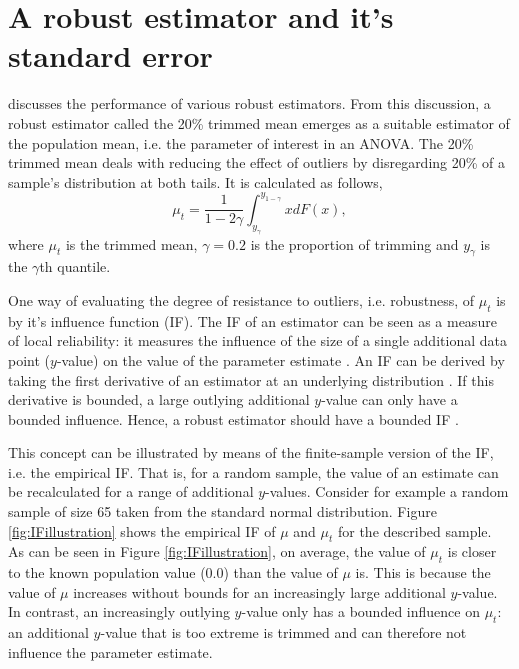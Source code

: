 \documentclass[11pt, a4paper]{article}
\begin{document}

\section{A robust estimator and it's standard error}
\label{section: Robust estimators}

\citet[pp.~45-93]{Wilcox2017} discusses the performance of various robust estimators. From this discussion, a robust estimator called the 20\% trimmed mean emerges as a suitable estimator of the population mean, i.e. the parameter of interest in an ANOVA. 
The 20\% trimmed mean deals with reducing the effect of outliers by disregarding 20\% of a sample's distribution at both tails. 
It is calculated as follows,
\begin{equation}
\mu_t = \frac{1}{1-2\gamma} \int_{y_\gamma}^{y_{1-\gamma}} xdF(x),
\end{equation}
where $\mu_t$ is the trimmed mean, $\gamma = 0.2$ is the proportion of trimming and $y_\gamma$ is the $\gamma$th quantile.

One way of evaluating the degree of resistance to outliers, i.e. robustness, of $\mu_t$ is by it's influence function (IF). 
The IF of an estimator can be seen as a measure of local reliability: it measures the influence of the size of a single additional data point ($y$-value) on the value of the parameter estimate \citep{Ruckstuhl2014}. 
An IF can be derived by taking the first derivative of an estimator at an underlying distribution \citep*[pp.~29-30]{Wilcox2017}. 
If this derivative is bounded, a large outlying additional $y$-value can only have a bounded influence. 
Hence, a robust estimator should have a bounded IF \citep[p.~30]{Wilcox2017}.

This concept can be illustrated by means of the finite-sample version of the IF, i.e. the empirical IF.
That is, for a random sample, the value of an estimate can be recalculated for a range of additional $y$-values.
Consider for example a random sample of size 65 taken from the standard normal distribution. 
Figure \ref{fig:IFillustration} shows the empirical IF of $\mu$ and $\mu_t$ for the described sample. 
As can be seen in Figure \ref{fig:IFillustration}, on average, the value of $\mu_t$ is closer to the known population value ($0.0$) than the value of $\mu$ is. This is because the value of $\mu$ increases without bounds for an increasingly large additional $y$-value. 
In contrast, an increasingly outlying $y$-value only has a bounded influence on $\mu_t$: an additional $y$-value that is too extreme is trimmed and can therefore not influence the parameter estimate. 
\end{document}
